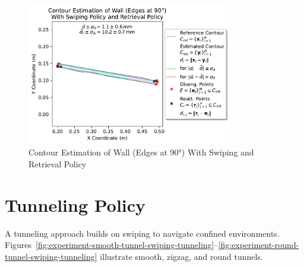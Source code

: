 \begin{figure}[htb]
    \centering
    \includegraphics[width=0.8\textwidth]{figures/experiments/wall-edges-90deg-swiping-retrieval}
    \caption{Contour Estimation of Wall (Edges at 90°) With Swiping and Retrieval Policy}
    \label{fig:experiment-wall-edges-90deg-swiping-retrieval}
\end{figure}


\section{Tunneling Policy}
A tunneling approach builds on swiping to navigate confined environments.
Figures~\ref{fig:experiment-smooth-tunnel-swiping-tunneling}--\ref{fig:experiment-round-tunnel-swiping-tunneling} illustrate smooth, zigzag, and round tunnels.

